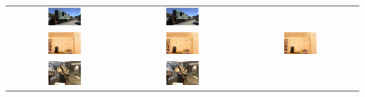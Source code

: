 \begin{tabular}{ccc}
            \includegraphics[width=0.3\textwidth]{../o-3dgs/eval/train/test/ours_30000/renders/00000.png} & 
            \includegraphics[width=0.3\textwidth]{../o-3dgs/eval/train/test/ours_30000/renders/00000.png} \\
            \includegraphics[width=0.3\textwidth]{../o-3dgs/eval/playroom/test/ours_30000/gt/00000.png} &
            \includegraphics[width=0.3\textwidth]{../o-3dgs/eval/playroom/test/ours_30000/renders/00000.png} & 
            \includegraphics[width=0.3\textwidth]{../o-3dgs/eval/playroom/test/ours_30000/renders/00000.png} \\
            \includegraphics[width=0.3\textwidth]{../o-3dgs/eval/horns/test/ours_30000/gt/00000.png} &
            \includegraphics[width=0.3\textwidth]{../o-3dgs/eval/horns/test/ours_30000/renders/00000.png} & 

\end{tabular}
